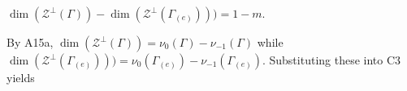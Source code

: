 $\dim(\mathcal{Z}^{\perp}(\Gamma)) - \dim(\mathcal{Z}^{\perp}(\Gamma_{(e)}))) = 1 - m.$

By A15a, $\dim(\mathcal{Z}^{\perp}(\Gamma)) = \nu_{0}(\Gamma) - \nu_{-1}(\Gamma)$ while $\dim(\mathcal{Z}^{\perp}(\Gamma_{(e)}))) = \nu_{0}(\Gamma_{(e)}) - \nu_{-1}(\Gamma_{(e)})$. Substituting these into C3 yields

